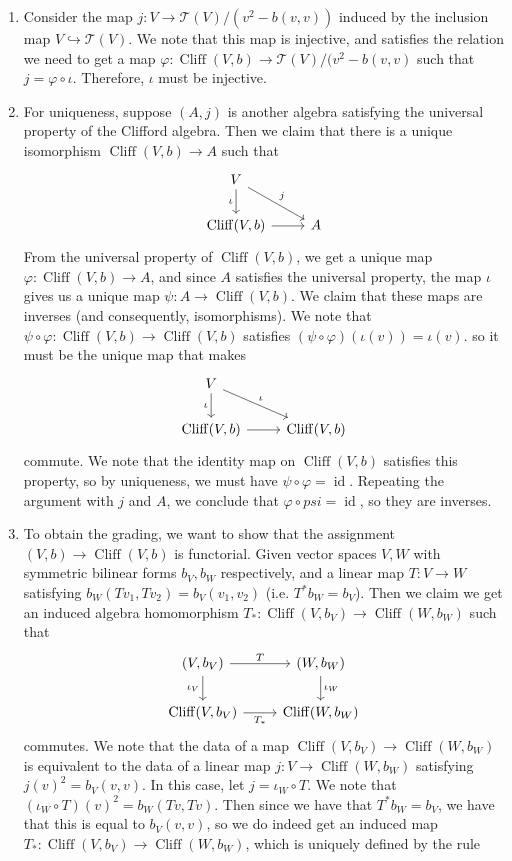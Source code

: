 \documentclass[psamsfonts]{amsart}
\theoremstyle{definition}
\theoremstyle{remark}
\DeclareMathOperator{\id}{id}
\DeclareMathOperator{\Cliff}{Cliff}
\begin{document}
\begin{enumerate}
\item Consider the map $j : V \to \mathcal{T}(V) / (v^2 - b(v,v))$ induced by the inclusion map $V \hookrightarrow \mathcal{T}(V)$.  We note that this map is injective, and satisfies the relation we need to get a map $\varphi : \Cliff(V,b) \to \mathcal{T}(V) / (v^2 - b(v,v)$ such that $j = \varphi \circ \iota$. Therefore, $\iota$ must be injective.
\item For uniqueness, suppose $(A, j)$ is another algebra satisfying the universal property of the Clifford algebra. Then we claim that there is a unique isomorphism $\Cliff(V,b) \to A$ such that 
$$\begin{tikzcd}
V \arrow[d, "\iota"'] \arrow[dr, "j"]\\
\Cliff(V,b) \arrow[r] & A
\end{tikzcd}$$
From the universal property of $\Cliff(V,b)$, we get a unique map $\varphi : \Cliff(V,b) \to A$, and since $A$ satisfies the universal property, the map $\iota$ gives us a unique map $\psi : A \to \Cliff(V,b)$. We claim that these maps are inverses (and consequently, isomorphisms). We note that $\psi \circ \varphi : \Cliff(V,b) \to \Cliff(V,b)$ satisfies $(\psi \circ \varphi)(\iota(v)) = \iota(v)$. so it must be the unique map that makes
$$\begin{tikzcd}
V \arrow[d, "\iota"'] \arrow[dr, "\iota"]\\
\Cliff(V,b) \arrow[r] & \Cliff(V,b)
\end{tikzcd}$$
commute. We note that the identity map on $\Cliff(V,b)$ satisfies this property, so by uniqueness, we must have $\psi \circ \varphi = \id$. Repeating the argument with $j$ and $A$, we conclude that $\varphi \circ psi = \id$, so they are inverses.
\item To obtain the grading, we want to show that the assignment $(V,b) \to \Cliff(V,b)$ is functorial. Given vector spaces $V,W$ with symmetric bilinear forms $b_V, b_W$ respectively, and a linear map $T : V \to W$ satisfying $b_W(Tv_1, Tv_2) = b_V(v_1, v_2)$ (i.e. $T^*b_W = b_V$). Then we claim we get an induced algebra homomorphism $T_* : \Cliff(V,b_V) \to \Cliff(W, b_W)$  such that
$$\begin{tikzcd}
(V, b_V) \arrow[r, "T"] \arrow[d, "\iota_V"']& (W, b_W) \arrow[d, "\iota_W"] \\
\Cliff(V, b_V) \arrow[r, "T_*"'] & \Cliff(W, b_W)
\end{tikzcd}$$
commutes. We note that the data of a map $\Cliff(V,b_V) \to \Cliff(W, b_W)$ is equivalent to the data of a linear map $j : V \to \Cliff(W, b_W)$ satisfying $j(v)^2 = b_V(v,v)$. In this case, let $j = \iota_W \circ T$. We note that $(\iota_W \circ T) (v)^2 = b_W(Tv, Tv)$. Then since we have that $T^*b_W = b_V$, we have that this is equal to $b_V(v,v)$, so we do indeed get an induced map $T_*: \Cliff(V,b_V) \to \Cliff(W, b_W)$, which is uniquely defined by the rule

\end{enumerate}
\end{document}
